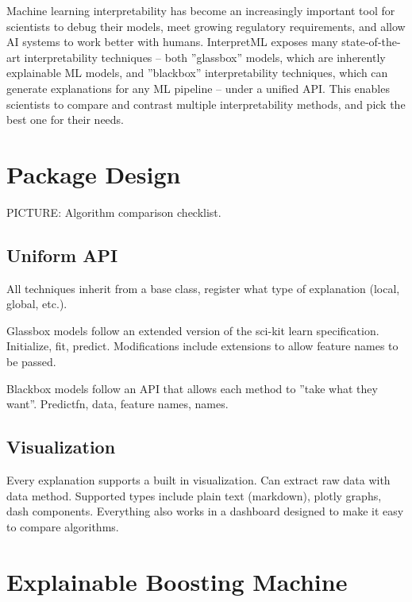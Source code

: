 \documentclass[twoside,11pt]{article}
\begin{document}
Machine learning interpretability has become an increasingly important tool for scientists to debug their models, meet growing regulatory requirements, and allow AI systems to work better with humans. InterpretML exposes many state-of-the-art interpretability techniques -- both ''glassbox'' models, which are inherently explainable ML models, and ''blackbox'' interpretability techniques, which can generate explanations for any ML pipeline -- under a unified API. This enables scientists to compare and contrast multiple interpretability methods, and pick the best one for their needs. 




\section{Package Design}

PICTURE: Algorithm comparison checklist. 

\subsection{Uniform API}

All techniques inherit from a base class, register what type of explanation (local, global, etc.). 

Glassbox models follow an extended version of the sci-kit learn specification. Initialize, fit, predict. Modifications include extensions to allow feature names to be passed. 

Blackbox models follow an API that allows each method to ''take what they want''. Predictfn, data, feature names, names. 

\subsection{Visualization}

Every explanation supports a built in visualization. Can extract raw data with data method. Supported types include plain text (markdown), plotly graphs, dash components. Everything also works in a dashboard designed to make it easy to compare algorithms. 

\section{Explainable Boosting Machine}
\end{document}
